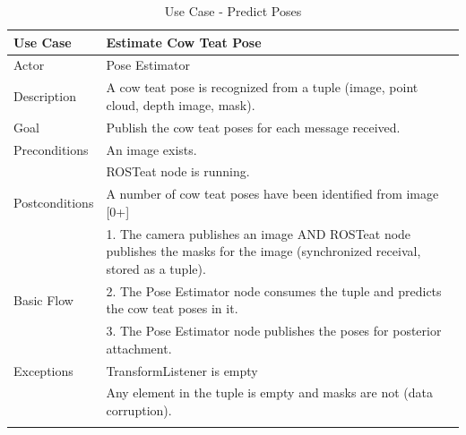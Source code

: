 \begin{longtable}{@{} p{3.5cm} p{10.5cm} @{}} \toprule
\textbf{Use Case}       & \textbf{Estimate Cow Teat Pose} \\ \midrule
Actor                   & Pose Estimator \\ \cmidrule{1-2}
Description             & A cow teat pose is recognized from a tuple (image, point cloud, depth image, mask). \\ \cmidrule{1-2}
Goal                    & Publish the cow teat poses for each message received. \\ \cmidrule{1-2}
Preconditions           & An image exists. \\ 
                        & ROSTeat node is running. \\ \cmidrule{1-2} 
Postconditions          & A number of cow teat poses have been identified from image [0+]\\ \cmidrule{1-2} 
                        & 1. The camera publishes an image AND ROSTeat node publishes the masks for the image (synchronized receival, stored as a tuple). \\ 
Basic Flow              & 2. The Pose Estimator node consumes the tuple and predicts the cow teat poses in it. \\
                        & 3. The Pose Estimator node publishes the poses for posterior attachment. \\ \cmidrule{1-2}
Exceptions             & TransformListener is empty \\ 
                       & Any element in the tuple is empty and masks are not (data corruption). \\ \bottomrule
\caption{Use Case - Predict Poses} \label{tab:tabcu-prop} \\
\end{longtable}
\lipsum[2]

